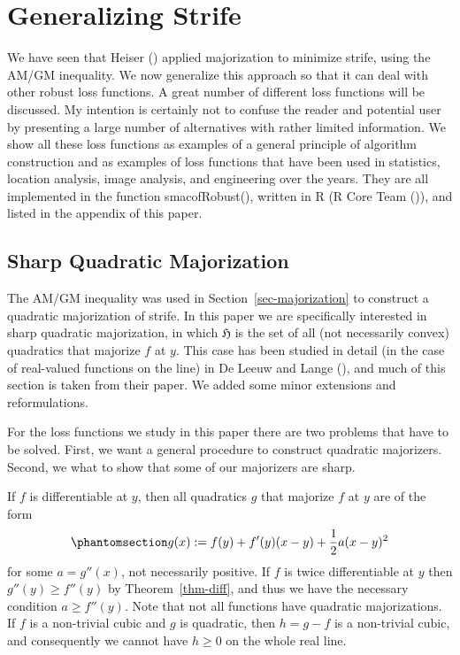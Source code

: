 \documentclass[
  12pt,
  letterpaper,
  DIV=11,
  numbers=noendperiod]{scrartcl}
\theoremstyle{definition}
\theoremstyle{definition}
\theoremstyle{plain}
\theoremstyle{plain}
\theoremstyle{plain}
\theoremstyle{remark}
\begin{document}
\section{Generalizing Strife}\label{generalizing-strife}

We have seen that Heiser () applied
majorization to minimize strife, using the AM/GM inequality. We now
generalize this approach so that it can deal with other robust loss
functions. A great number of different loss functions will be discussed.
My intention is certainly not to confuse the reader and potential user
by presenting a large number of alternatives with rather limited
information. We show all these loss functions as examples of a general
principle of algorithm construction and as examples of loss functions
that have been used in statistics, location analysis, image analysis,
and engineering over the years. They are all implemented in the function
smacofRobust(), written in R (R Core Team
()), and listed in the appendix of
this paper.

\subsection{Sharp Quadratic
Majorization}\label{sharp-quadratic-majorization}

The AM/GM inequality was used in Section~\ref{sec-majorization} to
construct a quadratic majorization of strife. In this paper we are
specifically interested in sharp quadratic majorization, in which
\(\mathfrak{H}\) is the set of all (not necessarily convex) quadratics
that majorize \(f\) at \(y\). This case has been studied in detail (in
the case of real-valued functions on the line) in De Leeuw and Lange
(), and much of this section is
taken from their paper. We added some minor extensions and
reformulations.

For the loss functions we study in this paper there are two problems
that have to be solved. First, we want a general procedure to construct
quadratic majorizers. Second, we what to show that some of our
majorizers are sharp.

If \(f\) is differentiable at \(y\), then all quadratics \(g\) that
majorize \(f\) at \(y\) are of the form
\begin{equation}\phantomsection\label{eq-qmaj}{
g(x):=f(y)+f'(y)(x-y)+\frac12a(x-y)^2
}\end{equation} for some \(a=g''(x)\), not necessarily positive. If
\(f\) is twice differentiable at \(y\) then \(g''(y)\geq f''(y)\) by
Theorem~\ref{thm-diff}, and thus we have the necessary condition
\(a\geq f''(y)\). Note that not all functions have quadratic
majorizations. If \(f\) is a non-trivial cubic and \(g\) is quadratic,
then \(h=g-f\) is a non-trivial cubic, and consequently we cannot have
\(h\geq 0\) on the whole real line.
\end{document}
